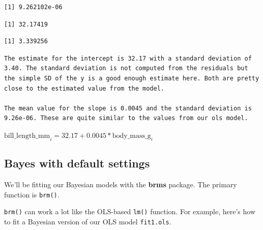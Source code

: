 \documentclass[
  letterpaper,
  DIV=11,
  numbers=noendperiod]{scrartcl}
\newenvironment{Shaded}{\begin{snugshade}}{\end{snugshade}}
\newcommand{\CommentTok}[1]{\textcolor[rgb]{0.37,0.37,0.37}{#1}}
\newcommand{\FunctionTok}[1]{\textcolor[rgb]{0.28,0.35,0.67}{#1}}
\newcommand{\NormalTok}[1]{\textcolor[rgb]{0.00,0.23,0.31}{#1}}
\newcommand{\SpecialCharTok}[1]{\textcolor[rgb]{0.37,0.37,0.37}{#1}}
\begin{document}
\begin{verbatim}
[1] 9.262102e-06
\end{verbatim}

\begin{Shaded}
\end{Shaded}

\begin{verbatim}
[1] 32.17419
\end{verbatim}

\begin{Shaded}
\end{Shaded}

\begin{verbatim}
[1] 3.339256
\end{verbatim}

\begin{verbatim}
The estimate for the intercept is 32.17 with a standard deviation of 3.40. The standard deviation is not computed from the residuals but the simple SD of the y is a good enough estimate here. Both are pretty close to the estimated value from the model.

The mean value for the slope is 0.0045 and the standard deviation is 9.26e-06. These are quite similar to the values from our ols model.
\end{verbatim}

\(\text{bill_length_mm}_i = 32.17 + 0.0045 * \text{body_mass_g}_i\)

\subsection{Bayes with default
settings}\label{bayes-with-default-settings}

We'll be fitting our Bayesian models with the \textbf{brms} package. The
primary function is \texttt{brm()}.

\texttt{brm()} can work a lot like the OLS-based \texttt{lm()} function.
For example, here's how to fit a Bayesian version of our OLS model
\texttt{fit1.ols}.
\end{document}

